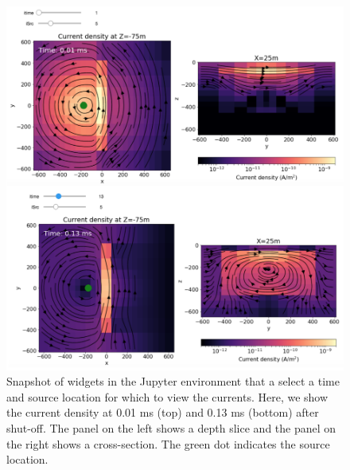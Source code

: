 \begin{figure}
    \begin{center}
    \includegraphics[width=0.8\columnwidth]{figures/currents-widget.png}
    \end{center}
\caption{
    Snapshot of widgets in the Jupyter environment that a select a time and source location for which to view the currents. Here, we show the current density at 0.01 ms (top) and 0.13 ms (bottom) after shut-off. The panel on the left shows a depth slice and the panel on the right shows a cross-section. The green dot indicates the source location.
}
\label{fig:currents-widget}
\end{figure}

